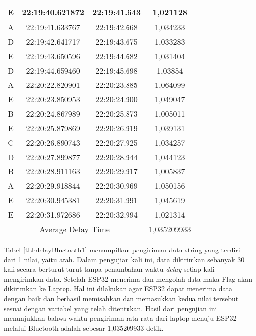 \begin{table}[!ht]
\begin{tabular}{|ccc|c|}
  \multicolumn{1}{|c|}{E}    & \multicolumn{1}{c|}{22:19:40.621872} & 22:19:41.643       & 1,021128    \\ \hline
  \multicolumn{1}{|c|}{A}    & \multicolumn{1}{c|}{22:19:41.633767} & 22:19:42.668       & 1,034233    \\ \hline
  \multicolumn{1}{|c|}{D}    & \multicolumn{1}{c|}{22:19:42.641717} & 22:19:43.675       & 1,033283    \\ \hline
  \multicolumn{1}{|c|}{E}    & \multicolumn{1}{c|}{22:19:43.650596} & 22:19:44.682       & 1,031404    \\ \hline
  \multicolumn{1}{|c|}{D}    & \multicolumn{1}{c|}{22:19:44.659460} & 22:19:45.698       & 1,03854     \\ \hline
  \multicolumn{1}{|c|}{A}    & \multicolumn{1}{c|}{22:20:22.820901} & 22:20:23.885       & 1,064099    \\ \hline
  \multicolumn{1}{|c|}{E}    & \multicolumn{1}{c|}{22:20:23.850953} & 22:20:24.900       & 1,049047    \\ \hline
  \multicolumn{1}{|c|}{B}    & \multicolumn{1}{c|}{22:20:24.867989} & 22:20:25.873       & 1,005011    \\ \hline
  \multicolumn{1}{|c|}{E}    & \multicolumn{1}{c|}{22:20:25.879869} & 22:20:26.919       & 1,039131    \\ \hline
  \multicolumn{1}{|c|}{C}    & \multicolumn{1}{c|}{22:20:26.890743} & 22:20:27.925       & 1,034257    \\ \hline
  \multicolumn{1}{|c|}{D}    & \multicolumn{1}{c|}{22:20:27.899877} & 22:20:28.944       & 1,044123    \\ \hline
  \multicolumn{1}{|c|}{B}    & \multicolumn{1}{c|}{22:20:28.911163} & 22:20:29.917       & 1,005837    \\ \hline
  \multicolumn{1}{|c|}{A}    & \multicolumn{1}{c|}{22:20:29.918844} & 22:20:30.969       & 1,050156    \\ \hline
  \multicolumn{1}{|c|}{E}    & \multicolumn{1}{c|}{22:20:30.945381} & 22:20:31.991       & 1,045619    \\ \hline
  \multicolumn{1}{|c|}{E}    & \multicolumn{1}{c|}{22:20:31.972686} & 22:20:32.994       & 1,021314    \\ \hline
  \multicolumn{3}{|c|}{Average Delay Time}                                               & 1,035209933 \\ \hline
  \end{tabular}
\end{table}

Tabel \ref{tbl:delayBluetooth1} menampilkan pengiriman data string yang terdiri dari 1 nilai, yaitu arah. Dalam pengujian kali ini, data dikirimkan sebanyak 30 kali secara berturut-turut tanpa penambahan waktu \emph{delay} setiap kali mengirimkan data. Setelah ESP32 menerima dan mengolah data maka Flag akan dikirimkan ke Laptop. Hal ini dilakukan agar ESP32 dapat menerima data dengan baik dan berhasil memisahkan dan memasukkan kedua nilai tersebut sesuai dengan variabel yang telah ditentukan. Hasil dari pengujian ini menunjukkan bahwa waktu pengiriman rata-rata dari laptop menuju ESP32 melalui Bluetooth adalah sebesar 1,035209933 detik.

